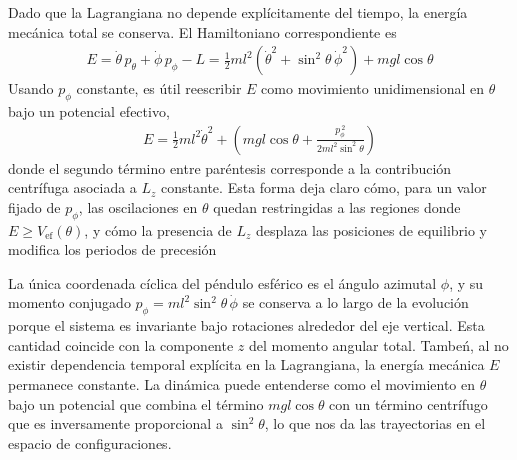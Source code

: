 \documentclass{article}
\begin{document}
Dado que la Lagrangiana no depende explícitamente del tiempo, la energía mecánica total se conserva. El Hamiltoniano correspondiente es
\begin{equation}
\begin{split}
E = \dot\theta\,p_\theta + \dot\phi\,p_\phi - L 
  = \tfrac12 m l^2\!\left(\dot\theta^2 + \sin^2\theta\,\dot\phi^2\right) + m g l \cos\theta
\end{split}\label{eq:energia-ampliada}
\end{equation}
Usando $p_\phi$ constante, es útil reescribir $E$ como movimiento unidimensional en $\theta$ bajo un potencial efectivo,
\begin{equation}
\begin{split}
E = \tfrac12 m l^2 \dot\theta^2 + \left( m g l \cos\theta + \frac{p_\phi^{\,2}}{2 m l^2 \sin^2\theta} \right)
\end{split}\label{eq:Vef-ampliada}
\end{equation}
donde el segundo término entre paréntesis corresponde a la contribución centrífuga asociada a $L_z$ constante. Esta forma deja claro cómo, para un valor fijado de $p_\phi$, las oscilaciones en $\theta$ quedan restringidas a las regiones donde $E \ge V_{\text{ef}}(\theta)$, y cómo la presencia de $L_z$ desplaza las posiciones de equilibrio y modifica los periodos de precesión

La única coordenada cíclica del péndulo esférico es el ángulo azimutal $\phi$, y su momento conjugado $p_\phi = m l^2 \sin^2\theta\,\dot\phi$ se conserva a lo largo de la evolución porque el sistema es invariante bajo rotaciones alrededor del eje vertical. Esta cantidad coincide con la componente $z$ del momento angular total. Tambeń, al no existir dependencia temporal explícita en la Lagrangiana, la energía mecánica $E$ permanece constante. La dinámica puede entenderse como el movimiento en $\theta$ bajo un potencial  que combina el término $mgl\cos\theta$ con un término centrífugo que es inversamente proporcional a $\sin^2\theta$, lo que nos da las trayectorias en el espacio de configuraciones.



\vspace{0.5cm}
\begin{center}
\end{center}  \vspace{0.5cm}
\end{document}

